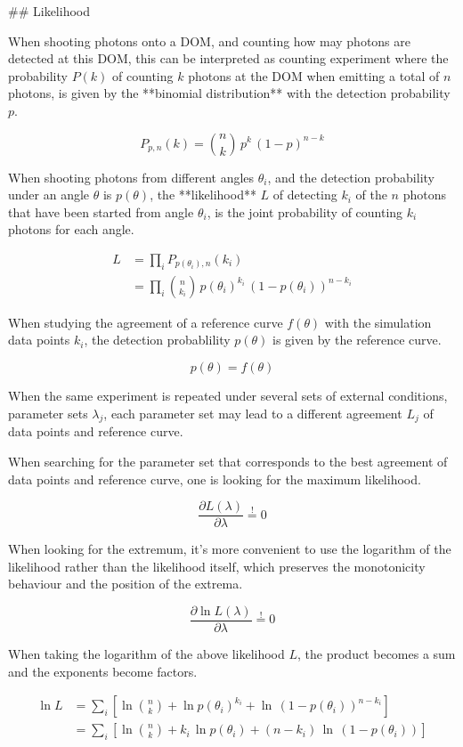 
## Likelihood

When shooting photons onto a DOM, and counting how may photons are detected at this DOM, this can be interpreted as counting experiment where the probability $P(k)$ of counting $k$ photons at the DOM when emitting a total of $n$ photons, is given by the **binomial distribution** with the detection probability $p$.

$$ P_{p,n}(k) = \binom{n}{k}\,p^k\,(1-p)^{n-k} $$

When shooting photons from different angles $\theta_i$, and the detection probability under an angle $\theta$ is $p(\theta)$, the **likelihood** $L$ of detecting $k_i$ of the $n$ photons that have been started from angle $\theta_i$, is the joint probability of counting $k_i$ photons for each angle.

\begin{align*}
  L &= \prod_{i} P_{p(\theta_i),n}(k_i) \\
    &= \prod_{i} \binom{n}{k_i}\,p(\theta_i)^{k_i}\,(1-p(\theta_i))^{n-k_i}
\end{align*}

When studying the agreement of a reference curve $f(\theta)$ with the simulation data points $k_i$, the detection probablility $p(\theta)$ is given by the reference curve.

$$ p(\theta) = f(\theta) $$

When the same experiment is repeated under several sets of external conditions, parameter sets $\lambda_j$, each parameter set may lead to a different agreement $L_j$ of data points and reference curve.

When searching for the parameter set that corresponds to the best agreement of data points and reference curve, one is looking for the maximum likelihood.

$$ \frac{\partial L(\lambda)}{\partial \lambda} \stackrel{!}{=} 0 $$

When looking for the extremum, it's more convenient to use the logarithm of the likelihood rather than the likelihood itself, which preserves the monotonicity behaviour and the position of the extrema.

$$ \frac{\partial \ln L(\lambda)}{\partial \lambda} \stackrel{!}{=} 0 $$

When taking the logarithm of the above likelihood $L$, the product becomes a sum and the exponents become factors.

\begin{align*}
  \ln L &= \sum_i \left[ \ln \binom{n}{k} + \ln p(\theta_i)^{k_i} + \ln\,(1 - p(\theta_i))^{n-k_i} \right] \\
        &= \sum_i \left[ \ln \binom{n}{k} + k_i\,\ln p(\theta_i) + (n-k_i)\,\ln\,(1 - p(\theta_i)) \right]
\end{align*}

